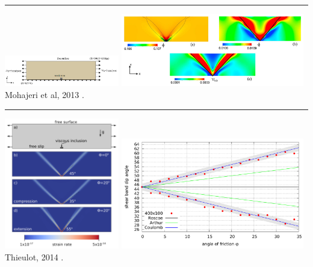\begin{center}\noindent\rule{8cm}{0.4pt}\end{center}

\begin{center}
\includegraphics[width=5cm]{images/benchmark_brick/mofm13a}
\includegraphics[width=8cm]{images/benchmark_brick/mofm13b}\\
{\captionfont Mohajeri et al, 2013 \cite{mofm13}.}
\end{center}

\begin{center}\noindent\rule{8cm}{0.4pt}\end{center}

\begin{center}
\includegraphics[width=5cm]{images/benchmark_brick/thie14a}
\includegraphics[width=8cm]{images/benchmark_brick/thie14b}\\
{\captionfont Thieulot, 2014 \cite{thie14}.}
\end{center}




